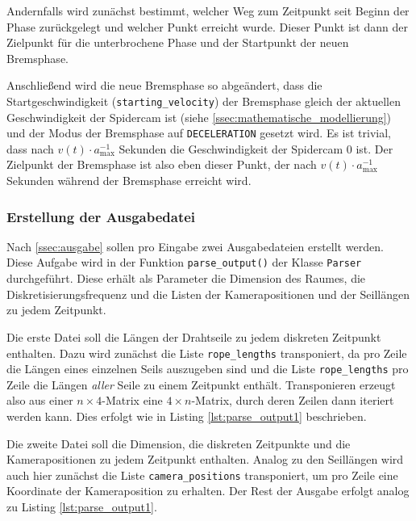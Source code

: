Andernfalls wird zunächst bestimmt, welcher Weg zum Zeitpunkt seit Beginn der Phase zurückgelegt und welcher Punkt erreicht wurde.
Dieser Punkt ist dann der Zielpunkt für die unterbrochene Phase und der Startpunkt der neuen Bremsphase.

Anschließend wird die neue Bremsphase so abgeändert, dass die Startgeschwindigkeit (\texttt{starting\_velocity}) der Bremsphase gleich der aktuellen Geschwindigkeit der Spidercam ist (siehe \ref{ssec:mathematische_modellierung}) und der Modus der Bremsphase auf \texttt{DECELERATION} gesetzt wird.
Es ist trivial, dass nach $v(t) \cdot a_{\max}^{-1}$ Sekunden die Geschwindigkeit der Spidercam 0 ist.
Der Zielpunkt der Bremsphase ist also eben dieser Punkt, der nach $v(t) \cdot a_{\max}^{-1}$ Sekunden während der Bremsphase erreicht wird.

\subsubsection{Erstellung der Ausgabedatei}
\label{sssec:erstellung_der_ausgabedatei}

Nach \ref{ssec:ausgabe} sollen pro Eingabe zwei Ausgabedateien erstellt werden.
Diese Aufgabe wird in der Funktion \texttt{parse\_output()} der Klasse \texttt{Parser} durchgeführt.
Diese erhält als Parameter die Dimension des Raumes, die Diskretisierungsfrequenz und die Listen der Kamerapositionen und der Seillängen zu jedem Zeitpunkt.

Die erste Datei soll die Längen der Drahtseile zu jedem diskreten Zeitpunkt enthalten.
Dazu wird zunächst die Liste \texttt{rope\_lengths} transponiert, da pro Zeile die Längen eines einzelnen Seils auszugeben sind und die Liste \texttt{rope\_lengths} pro Zeile die Längen \emph{aller} Seile zu einem Zeitpunkt enthält.
Transponieren erzeugt also aus einer $n \times 4$-Matrix eine $4 \times n$-Matrix, durch deren Zeilen dann iteriert werden kann.
Dies erfolgt wie in Listing \ref{lst:parse_output1} beschrieben.

Die zweite Datei soll die Dimension, die diskreten Zeitpunkte und die Kamerapositionen zu jedem Zeitpunkt enthalten.
Analog zu den Seillängen wird auch hier zunächst die Liste \texttt{camera\_positions} transponiert, um pro Zeile eine Koordinate der Kameraposition zu erhalten.
Der Rest der Ausgabe erfolgt analog zu Listing \ref{lst:parse_output1}.

